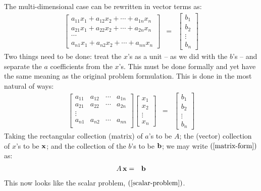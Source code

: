 \documentclass{article}
\begin{document}
The multi-dimensional case can be rewritten in vector terms as:
\begin{eqnarray}
  \left[
  \begin{array}{c}
  a_{11} x_1 + a_{12} x_2 + \cdots + a_{1n} x_n \\
  a_{21} x_1 + a_{22} x_2 + \cdots + a_{2n} x_n \\
  \cdots  \\
    a_{n1} x_1 + a_{n2} x_2 + \cdots + a_{nn} x_n
  \end{array}
  \right] & = & \left[
                 \begin{array}{c}
                   b_1 \\
                   b_2 \\
                   \vdots \\
                   b_n
                 \end{array}
   \right] \label{vector-form}
\end{eqnarray}
Two things need to be done: treat the $x$'s as a unit -- as we did with the
$b$'s -- and separate the $a$ coefficients from the $x$'s. This must be done formally
and yet have the same meaning as the original problem formulation.
This is done in the most natural of ways:
\begin{eqnarray}
  \left[
  \begin{array}{cccc}
    a_{11} & a_{12} & \cdots & a_{1n} \\
    a_{21} & a_{22} & \cdots & a_{2n} \\
    \vdots \\
    a_{n1} & a_{n2} & \cdots & a_{nn} \\
    \end{array}
  \right]
  \left[
  \begin{array}{c}
    x_1 \\
    x_2 \\
    \vdots \\
    x_n
  \end{array}
  \right] & = &
                \left[
                \begin{array}{c}
                  b_1 \\
                  b_2 \\
                  \vdots \\
                  b_n
                \end{array}
  \right] \label{matrix-form}
\end{eqnarray}
Taking the rectangular collection (matrix) of $a$'s to be $A$; the (vector) collection
of $x$'s to be ${\bf x}$; and the collection of the $b$'s to be ${\bf b}$;
we may write $(\ref{matrix-form})$ as:
\begin{eqnarray}
  A \, {\bf x} & = & {\bf b} \label{concise-matrix-form}
\end{eqnarray}
This now looks like the scalar problem, $(\ref{scalar-problem})$.
\end{document}
